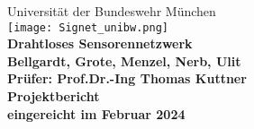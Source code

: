 
\begin{titlepage}
    \centering
    \vspace*{1cm}

    {\LARGE Universität der Bundeswehr München}\\[1.5cm]


    \texttt{[image: Signet\_unibw.png]}\\[1.5cm]

    {\Huge \textbf{Drahtloses Sensorennetzwerk}}\\[1.0cm]


    



    {\Large \textbf{Bellgardt, Grote, Menzel, Nerb, Ulit}}\\[1cm]

    {\Large \textbf{Prüfer: Prof.Dr.-Ing Thomas Kuttner}}\\[2cm]


    {\Large \textbf{Projektbericht}}\\[2cm]

    {\Large \textbf{eingereicht im Februar 2024}}\\[2cm]

\end{titlepage}

